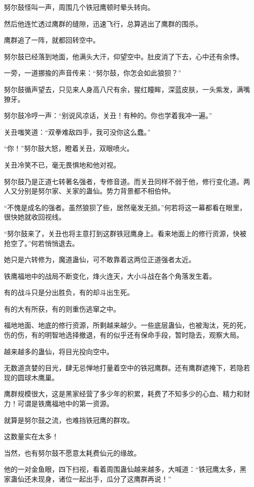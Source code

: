 \begin{this_body}
努尔鼓怪叫一声，周围几个铁冠鹰顿时晕头转向。

然后他连忙透过鹰群的缝隙，迅速飞行，总算逃出了鹰群的围杀。

鹰群追了一阵，就都回转空中。

努尔鼓已经落到地面，他满头大汗，仰望空中。肚皮消了下去，心中还有余悸。

一旁，一道挪揄的声音传来：“努尔鼓，你怎会如此狼狈？”

努尔鼓循声望去，只见来人身高八尺有余，猩红瞳眸，深蓝皮肤，一头紫发，满嘴獠牙。

努尔鼓冷哼一声：“别说风凉话，关丑！有种的。你也学着我冲一遍。”

关丑嗤笑道：“双拳难敌四手，我可没你这么蠢。”

“你！”努尔鼓大怒，瞪着关丑，双眼喷火。

关丑冷笑不已，毫无畏惧地和他对视。

努尔鼓乃是正道七转著名强者，专修音道。而关丑同样不弱于他，修行变化道。两人又分别是努尔家、关家的蛊仙。势力背景都不相伯仲。

“不愧是成名的强者。虽然狼狈了些，居然毫发无损。”何若将这一幕都看在眼里，很快她就收回视线。

“努尔鼓来了，关丑也将主意打到这群铁冠鹰身上。看来地面上的修行资源，快被抢空了。”何若悄悄退去。

她只是六转修为，魔道蛊仙，可不敢靠着这两位正道强者太近。

铁鹰福地中的战局不断变化，烽火连天，大小斗战在各个角落发生着。

有的战斗只是分出胜负，有的却斗出生死。

有的大有所获，有的则重伤逃窜之中。

福地地面、地底的修行资源，所剩越来越少。一些底层蛊仙，也被淘汰，死的死，伤的伤，有的明智地选择撤退，有的似乎还有保命手段，暂时隐去，观察大局。

越来越多的蛊仙，将目光投向空中。

无数道贪婪的目光，肆无忌惮地打量着空中的铁冠鹰群。还有鹰群遮掩下，若隐若现的圆球木鹰巢。

鹰群规模很大，这是黑家经营了多少年的积累，耗费了不知多少的心血、精力和财力！可谓是铁鹰福地中的第一资源。

就算是努尔鼓之流，也难挡铁冠鹰的群攻。

这数量实在太多！

当然，也有努尔鼓不愿意太耗费仙元的缘故。

他的一对金鱼眼，四下扫视，看着周围蛊仙越来越多，大喊道：“铁冠鹰太多，黑家蛊仙还未现身，诸位一起出手，瓜分了这鹰群再说！”


\end{this_body}
